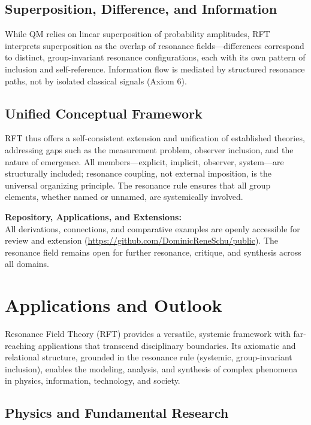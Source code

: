 \documentclass[12pt]{article}
\begin{document}
\subsection{Superposition, Difference, and Information}
While QM relies on linear superposition of probability amplitudes, RFT interprets superposition as the overlap of resonance fields—differences correspond to distinct, group-invariant resonance configurations, each with its own pattern of inclusion and self-reference. Information flow is mediated by structured resonance paths, not by isolated classical signals (Axiom 6).

\subsection{Unified Conceptual Framework}
RFT thus offers a self-consistent extension and unification of established theories, addressing gaps such as the measurement problem, observer inclusion, and the nature of emergence. All members—explicit, implicit, observer, system—are structurally included; resonance coupling, not external imposition, is the universal organizing principle. The resonance rule ensures that all group elements, whether named or unnamed, are systemically involved.

\medskip

\textbf{Repository, Applications, and Extensions:}\\
All derivations, connections, and comparative examples are openly accessible for review and extension (\url{https://github.com/DominicReneSchu/public}). The resonance field remains open for further resonance, critique, and synthesis across all domains.

\section{Applications and Outlook}

Resonance Field Theory (RFT) provides a versatile, systemic framework with far-reaching applications that transcend disciplinary boundaries. Its axiomatic and relational structure, grounded in the resonance rule (systemic, group-invariant inclusion), enables the modeling, analysis, and synthesis of complex phenomena in physics, information, technology, and society.

\subsection{Physics and Fundamental Research}
\end{document}
